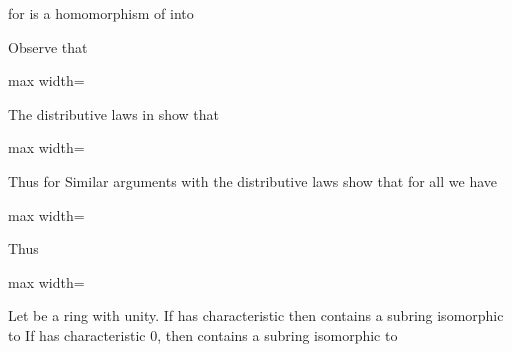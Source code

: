 \documentclass[11pt,oneside]{article}
\begin{document}
\begin{BookBody}
\noindent for  is a homomorphism of  into 

 Observe that

\begin{center}\begin{adjustbox}{max width=\linewidth}\end{adjustbox}\end{center}

\noindent The distributive laws in  show that

\begin{center}\begin{adjustbox}{max width=\linewidth}\end{adjustbox}\end{center}

Thus  for  Similar arguments with the distributive laws show that for all  we have

\begin{center}\begin{adjustbox}{max width=\linewidth}\end{adjustbox}\end{center}

\noindent Thus

\begin{center}\begin{adjustbox}{max width=\linewidth}\end{adjustbox}\end{center} \BookEnd{\blacklozenge}

 Let  be a ring with unity. If  has characteristic  then  contains a subring isomorphic to  If  has characteristic 0, then  contains a subring isomorphic to 


\end{BookBody}
\end{document}
